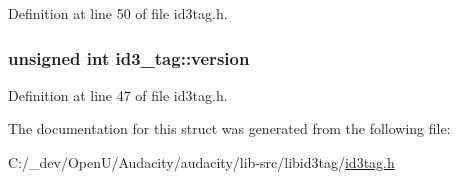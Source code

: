 Definition at line 50 of file id3tag.\+h.

\subsubsection[{\texorpdfstring{version}{version}}]{\setlength{\rightskip}{0pt plus 5cm}unsigned {\bf int} id3\+\_\+tag\+::version}\hypertarget{structid3__tag_ad8a634ed8b0daf8d8fafffd04e4f3058}{}\label{structid3__tag_ad8a634ed8b0daf8d8fafffd04e4f3058}


Definition at line 47 of file id3tag.\+h.



The documentation for this struct was generated from the following file\+:\begin{DoxyCompactItemize}
\item 
C\+:/\+\_\+dev/\+Open\+U/\+Audacity/audacity/lib-\/src/libid3tag/\hyperlink{id3tag_8h}{id3tag.\+h}\end{DoxyCompactItemize}
